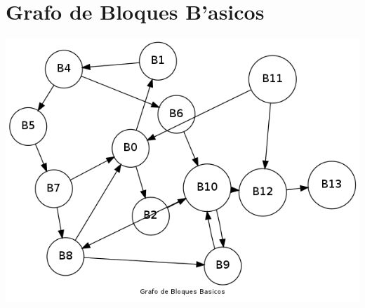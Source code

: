 \documentclass[twocolumn,12pt,letterpaper]{article}
\theoremstyle{definition} \newtheorem{definicion}{Definici\'{o}n}
\theoremstyle{plain} \newtheorem{teorema}{Teorema}
\theoremstyle{plain} \newtheorem{lema}{Lema}
\begin{document}
\section{Grafo de Bloques B'asicos}

\includegraphics[width=\textwidth]{bla.png}
\end{document}
